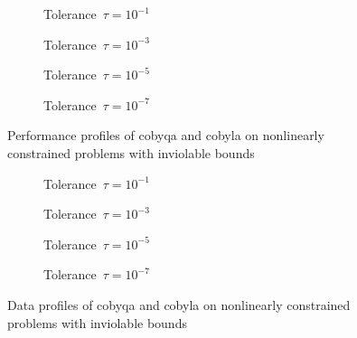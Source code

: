 \begin{figure}[ht]
    \centering
    \begin{subfigure}[b]{0.49\textwidth}
        \centering
        \caption{Tolerance~$\tau = 10^{-1}$}
    \end{subfigure}
    \hfill
    \begin{subfigure}[b]{0.49\textwidth}
        \centering
        \caption{Tolerance~$\tau = 10^{-3}$}
    \end{subfigure}
    \begin{subfigure}[b]{0.49\textwidth}
        \centering
        \caption{Tolerance~$\tau = 10^{-5}$}
    \end{subfigure}
    \hfill
    \begin{subfigure}[b]{0.49\textwidth}
        \centering
        \caption{Tolerance~$\tau = 10^{-7}$}
    \end{subfigure}
    \caption[Performance profiles on nonlinearly constrained problems with bounds]{Performance profiles of \gls{cobyqa} and \gls{cobyla} on nonlinearly constrained problems with inviolable bounds}
    \label{fig:perf-nonlinearly-constrained-problems-bounds}
\end{figure}

\begin{figure}[ht]
    \centering
    \begin{subfigure}[b]{0.49\textwidth}
        \centering
        \caption{Tolerance~$\tau = 10^{-1}$}
    \end{subfigure}
    \hfill
    \begin{subfigure}[b]{0.49\textwidth}
        \centering
        \caption{Tolerance~$\tau = 10^{-3}$}
    \end{subfigure}
    \begin{subfigure}[b]{0.49\textwidth}
        \centering
        \caption{Tolerance~$\tau = 10^{-5}$}
    \end{subfigure}
    \hfill
    \begin{subfigure}[b]{0.49\textwidth}
        \centering
        \caption{Tolerance~$\tau = 10^{-7}$}
    \end{subfigure}
    \caption[Data profiles on nonlinearly constrained problems with bounds]{Data profiles of \gls{cobyqa} and \gls{cobyla} on nonlinearly constrained problems with inviolable bounds}
    \label{fig:data-nonlinearly-constrained-problems-bounds}
\end{figure}

